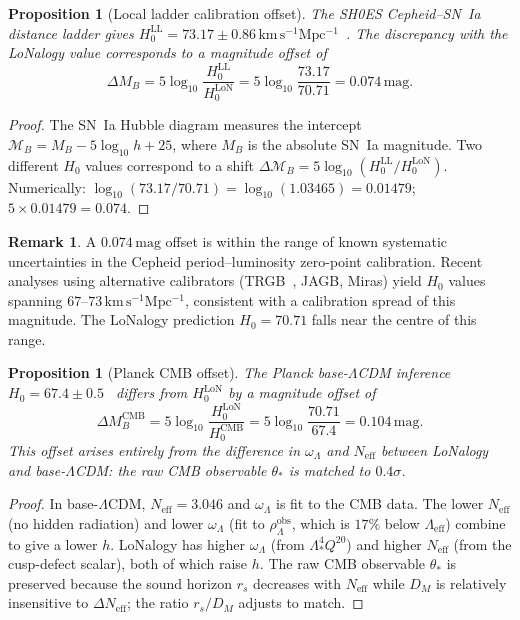 \documentclass[12pt]{article}
\theoremstyle{plain}
\newtheorem{proposition}[theorem]{Proposition}
\theoremstyle{definition}
\newtheorem{remark}[theorem]{Remark}
\numberwithin{equation}{section}
\newcommand{\eff}{\mathrm{eff}}
\newcommand{\obs}{\mathrm{obs}}
\newcommand{\LoN}{\mathrm{LoN}}
\begin{document}
\begin{proposition}[Local ladder calibration offset]\label{prop:offset}
The SH0ES Cepheid--SN~Ia distance ladder gives
$H_0^{\mathrm{LL}}=73.17\pm0.86\,\mathrm{km\,s^{-1}Mpc^{-1}}$~\cite{SH0ES2022,Breuval2024}.
The discrepancy with the LoNalogy value corresponds to a magnitude offset of
\begin{equation}
\Delta M_B = 5\log_{10}\frac{H_0^{\mathrm{LL}}}{H_0^{\LoN}}
= 5\log_{10}\frac{73.17}{70.71}
= 0.074\,\mathrm{mag}.
\end{equation}
\end{proposition}

\begin{proof}
The SN~Ia Hubble diagram measures the intercept
$\mathcal{M}_B=M_B-5\log_{10}h+25$, where $M_B$ is the absolute
SN~Ia magnitude.  Two different $H_0$ values correspond to a
shift $\Delta\mathcal{M}_B=5\log_{10}(H_0^{\mathrm{LL}}/H_0^{\LoN})$.
Numerically: $\log_{10}(73.17/70.71)=\log_{10}(1.03465)=0.01479$;
$5\times0.01479=0.074$.
\end{proof}

\begin{remark}
A $0.074\,\mathrm{mag}$ offset is within the range of known systematic
uncertainties in the Cepheid period--luminosity zero-point calibration.
Recent analyses using alternative calibrators
(TRGB~\cite{Freedman2021}, JAGB, Miras) yield $H_0$ values spanning
$67$--$73\,\mathrm{km\,s^{-1}Mpc^{-1}}$, consistent with a calibration
spread of this magnitude.  The LoNalogy prediction $H_0=70.71$ falls
near the centre of this range.
\end{remark}

\begin{proposition}[Planck CMB offset]\label{prop:CMBoffset}
The Planck base-$\Lambda$CDM inference $H_0=67.4\pm0.5$~\cite{Planck2018}
differs from $H_0^{\LoN}$ by a magnitude offset of
\begin{equation}
\Delta M_B^{\mathrm{CMB}} = 5\log_{10}\frac{H_0^{\LoN}}{H_0^{\mathrm{CMB}}}
= 5\log_{10}\frac{70.71}{67.4} = 0.104\,\mathrm{mag}.
\end{equation}
This offset arises entirely from the difference in $\omega_\Lambda$
and $N_{\eff}$ between LoNalogy and base-$\Lambda$CDM: the raw CMB
observable $\theta_*$ is matched to $0.4\sigma$.
\end{proposition}

\begin{proof}
In base-$\Lambda$CDM, $N_{\eff}=3.046$ and $\omega_\Lambda$ is fit to
the CMB data.  The lower $N_{\eff}$ (no hidden radiation) and lower
$\omega_\Lambda$ (fit to $\rho_\Lambda^{\obs}$, which is $17\%$ below
$\Lambda_{\eff}$) combine to give a lower $h$.
LoNalogy has higher $\omega_\Lambda$ (from $\Lambda_*^4Q^{20}$) and
higher $N_{\eff}$ (from the cusp-defect scalar), both of which raise $h$.
The raw CMB observable $\theta_*$ is preserved because the sound horizon
$r_s$ decreases with $N_{\eff}$ while $D_M$ is relatively insensitive
to $\Delta N_{\eff}$; the ratio $r_s/D_M$ adjusts to match.
\end{proof}
\end{document}
